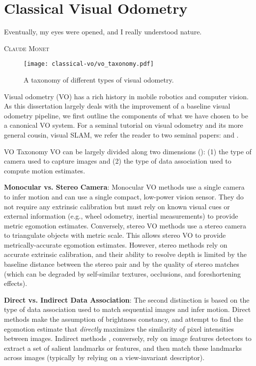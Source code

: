 \chapter{Classical Visual Odometry}
\label{ch:vo}
\epigraph{Eventually, my eyes were opened, and I really understood nature.}{\textsc{Claude Monet}}

\begin{figure}[h!]
\begin{center}
		\texttt{[image: classical-vo/vo\_taxonomy.pdf]}
		\caption{A taxonomy of different types of visual odometry.}
  	\label{fig:vo_taxonomy}
\end{center}
\end{figure}


Visual odometry (VO) has a rich history in mobile robotics and computer vision. As this dissertation largely deals with the improvement of a baseline visual odometry pipeline, we first outline the components of what we have chosen to be a canonical VO system. For a seminal tutorial on visual odometry and its more general cousin, visual SLAM, we refer the reader to two seminal papers: \cite{Scaramuzza2011-qr} and \cite{Cadena2016-ds}.
\newpage
\begin{remark}{VO Taxonomy}
VO can be largely divided along two dimensions (): (1) the type of camera used to capture images and (2) the type of data association used to compute motion estimates. 

\textbf{Monocular vs. Stereo Camera}:
 Monocular VO methods \citep{engel_direct_2018,Tsotsos2015} use a single camera to infer motion and can use a single compact, low-power vision sensor. They do not require any extrinsic calibration but must rely on known visual cues or external information (e.g., wheel odometry, inertial measurements) to provide metric egomotion estimates. Conversely, stereo VO methods \citep{engel_direct_2018, Leutenegger2015-fk, Cvisic2015-mt} use a stereo camera to triangulate objects with metric scale. This allows stereo VO to provide metrically-accurate egomotion estimates. However, stereo methods rely on accurate extrinsic calibration, and their ability to resolve depth is limited by the baseline distance between the stereo pair and by the quality of stereo matches (which can be degraded by self-similar textures, occlusions, and foreshortening effects). 

\textbf{Direct vs. Indirect Data Association}:
The second distinction is based on the type of data association used to match sequential images and infer motion. Direct methods \citep{engel_direct_2018,wang_stereo_2017} make the assumption of brightness constancy, and attempt to find the egomotion estimate that \textit{directly} maximizes the similarity of pixel intensities between images. Indirect methods \citep{Leutenegger2015-fk,Cvisic2015-mt}, conversely, rely on image features detectors to extract a set of salient landmarks or features, and then match these landmarks across images (typically by relying on a view-invariant descriptor).	
\end{remark}



